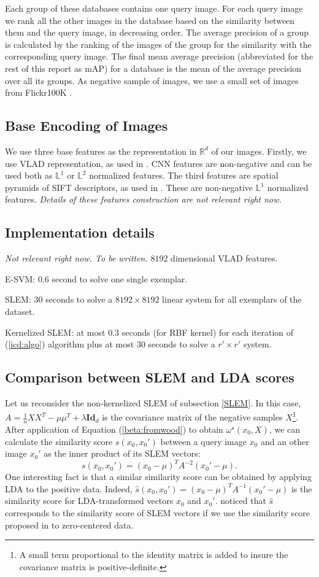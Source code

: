 \documentclass[10pt,twocolumn,letterpaper]{article}
\newcommand{\RR}{\mathbb R}
\begin{document}
Each group of these databases contains one query image. For each query image we rank all the other images in the database based on the similarity between them and the query image, in decreasing order. The average precision of a group is calculated by the ranking of the images of the group for the similarity with the corresponding query image. The final mean average precision (abbreviated for the rest of this report as mAP) for a database is the mean of the average precision over all its groups.
As negative sample of images, we use a small set of images from Flickr100K \cite{oxford}.
\subsection{Base Encoding of Images}
We use three base features as the representation in $\RR^d$ of our images. Firstly, we use VLAD representation, as used in \cite{ZePe15}. 
CNN features are non-negative and can be used both as $\mathbb{L}^1$ or $\mathbb{L}^2$ normalized features. The third features are spatial pyramids of SIFT descriptors, as used in \cite{spk}. These are non-negative $\mathbb{L}^1$ normalized features. \emph{\color{red} Details of these features construction are not relevant right now.}
\subsection{Implementation details}
\emph{\color{red} Not relevant right now.  To be written.}
$8192$ dimensional VLAD features.

E-SVM: $0.6$ second to solve one single exemplar.

SLEM: $30$ seconds to solve a $8192\times 8192$ linear system for all exemplars of the dataset.

Kernelized SLEM: at most $0.3$ seconds (for RBF kernel) for each iteration of (\ref{icd:algo}) algorithm plus at most $30$ seconds to solve a $r'\times r'$ system.

\subsection{Comparison between SLEM and LDA scores}
Let us reconsider the non-kernelized SLEM of subsection \ref{SLEM}. In this case, $A = \frac{1}{n}XX^T-\mu\mu^T+\lambda\textbf{Id}_d$ is the covariance matrix of the negative samples $X$\footnote{A small term proportional to the identity matrix is added to insure the covariance matrix is positive-definite.}. After application of Equation (\ref{beta:fromwood}) to obtain $\omega^\star(x_0,X)$, we can calculate the similarity score $s(x_0,x_0')$ between a query image $x_0$ and an other image $x_0'$ as the inner product of its SLEM vectors:
\begin{equation}
s(x_0,x_0') = (x_0-\mu)^TA^{-2}(x_0'-\mu).
\end{equation}
One interesting fact is that a similar similarity score can be obtained by applying LDA to the positive data. 
Indeed, $\hat{s}(x_0,x_0') = (x_0-\mu)^TA^{-1}(x_0'-\mu)$ is the similarity score for LDA-transformed vectors $x_0$ and $x_0'$. 
\cite{Koba15} noticed that $\hat{s}$ corresponds to the similarity score of SLEM vectors if we use the similarity score proposed in \cite{Efros11} to zero-centered data.
\end{document}
